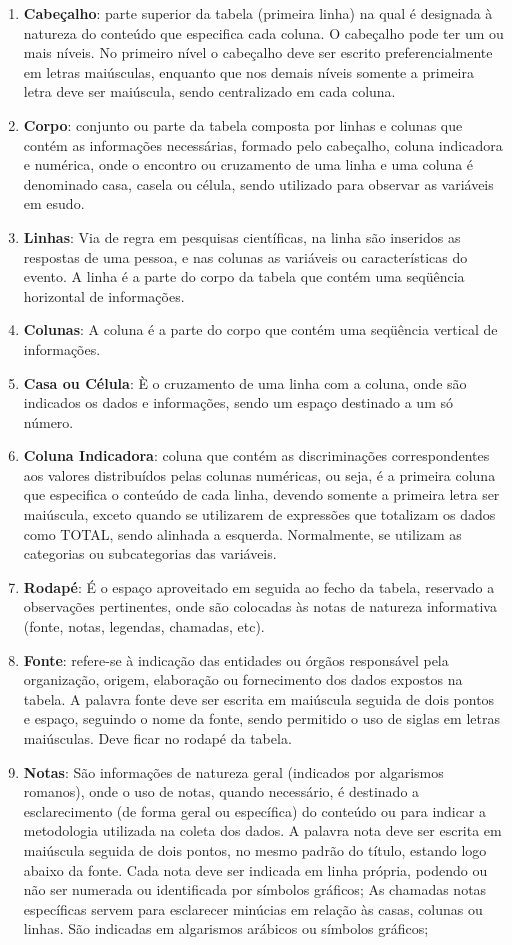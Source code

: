 \begin{enumerate}
\item \textbf{Cabeçalho}: parte superior da tabela (primeira linha) na qual é designada à natureza do conteúdo que especifica cada coluna. O cabeçalho pode ter um ou mais níveis. No primeiro nível o cabeçalho deve ser escrito preferencialmente em letras maiúsculas, enquanto que nos demais níveis somente a primeira letra deve ser maiúscula, sendo centralizado em cada coluna.
\item \textbf{Corpo}: conjunto ou parte da tabela composta por linhas e colunas que contém as informações necessárias, formado pelo cabeçalho, coluna indicadora e numérica, onde o encontro ou cruzamento de uma linha e uma coluna é denominado casa, casela ou célula, sendo utilizado para observar as variáveis em esudo. 
\item \textbf{Linhas}: Via de regra em pesquisas científicas, na linha são inseridos as respostas de uma pessoa, e nas colunas as variáveis ou características do evento. A linha é a parte do corpo da tabela que contém uma seqüência horizontal de informações.
\item \textbf{Colunas}: A coluna é a parte do corpo que contém uma seqüência vertical de informações.
\item \textbf{Casa ou Célula}: È o cruzamento de uma linha com a coluna, onde são indicados os dados e informações, sendo um espaço destinado a um só número.
\item \textbf{Coluna Indicadora}: coluna que contém as discriminações correspondentes aos valores distribuídos pelas colunas numéricas, ou seja, é a primeira coluna que especifica o conteúdo de cada linha, devendo somente a primeira letra ser maiúscula, exceto quando se utilizarem de expressões que totalizam os dados como TOTAL, sendo alinhada a esquerda. Normalmente, se utilizam as categorias ou subcategorias das variáveis.
\item \textbf{Rodapé}: É o espaço aproveitado em seguida ao fecho da tabela, reservado a observações pertinentes, onde são colocadas às notas de natureza informativa (fonte, notas, legendas, chamadas, etc).
\item \textbf{Fonte}: refere-se à indicação das entidades ou órgãos responsável pela organização, origem, elaboração ou fornecimento dos dados expostos na tabela. A palavra fonte deve ser escrita em maiúscula seguida de dois pontos e espaço, seguindo o nome da fonte, sendo permitido o uso de siglas em letras maiúsculas. Deve ficar no rodapé da tabela. 
\item \textbf{Notas}: São informações de natureza geral (indicados por algarismos romanos), onde o uso de notas, quando necessário, é destinado a esclarecimento (de forma geral ou específica) do conteúdo ou para indicar a metodologia utilizada na coleta dos dados. A palavra nota deve ser escrita em maiúscula seguida de dois pontos, no mesmo padrão do título, estando logo abaixo da fonte. Cada nota deve ser indicada em linha própria, podendo ou não ser numerada ou identificada por símbolos gráficos; As chamadas notas específicas servem para esclarecer minúcias em relação às casas, colunas ou linhas. São indicadas em algarismos arábicos ou símbolos gráficos;

\end{enumerate}
